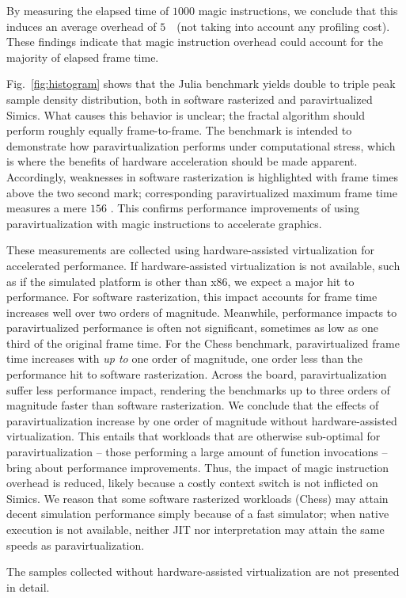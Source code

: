 By measuring the elapsed time of $1000$ magic instructions, we conclude that this induces an average overhead of $5$~\milli\second\ (not taking into account any profiling cost).
These findings indicate that magic instruction overhead could account for the majority of elapsed frame time.

Fig.~\ref{fig:histogram} shows that the Julia benchmark yields double to triple peak sample density distribution, both in software rasterized and paravirtualized Simics.
What causes this behavior is unclear; the fractal algorithm should perform roughly equally frame-to-frame.
The benchmark is intended to demonstrate how paravirtualization performs under computational stress, which is where the benefits of hardware acceleration should be made apparent.
Accordingly, weaknesses in software rasterization is highlighted with frame times above the two second mark; corresponding paravirtualized maximum frame time measures a mere $156$ \milli\second.
This confirms performance improvements of using paravirtualization with magic instructions to accelerate graphics.

These measurements are collected using hardware-assisted virtualization for accelerated performance.
If hardware-assisted virtualization is not available, such as if the simulated platform is other than x86, we expect a major hit to performance.
For software rasterization, this impact accounts for frame time increases well over two orders of magnitude.
Meanwhile, performance impacts to paravirtualized performance is often not significant, sometimes as low as one third of the original frame time.
For the Chess benchmark, paravirtualized frame time increases with \textit{up to} one order of magnitude, one order less than the performance hit to software rasterization.
Across the board, paravirtualization suffer less performance impact, rendering the benchmarks up to three orders of magnitude faster than software rasterization.
We conclude that the effects of paravirtualization increase by one order of magnitude without hardware-assisted virtualization.
This entails that workloads that are otherwise sub-optimal for paravirtualization -- those performing a large amount of function invocations -- bring about performance improvements.
Thus, the impact of magic instruction overhead is reduced, likely because a costly context switch is not inflicted on Simics.
We reason that some software rasterized workloads (Chess) may attain decent simulation performance simply because of a fast simulator; when native execution is not available, neither JIT nor interpretation may attain the same speeds as paravirtualization.

The samples collected without hardware-assisted virtualization are not presented in detail. %
